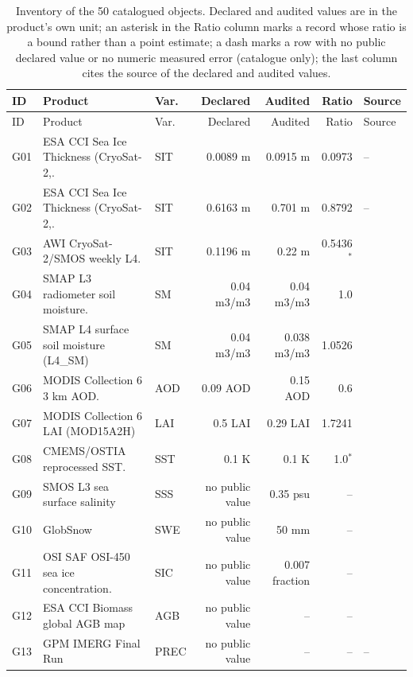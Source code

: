 \scriptsize
\setlength{\tabcolsep}{3pt}
\begin{longtable}{@{}l p{2.4cm} l r r r p{2.3cm}@{}}
\caption{Inventory of the 50 catalogued objects. Declared and audited values are in the product's own unit; an asterisk in the Ratio column marks a record whose ratio is a bound rather than a point estimate; a dash marks a row with no public declared value or no numeric measured error (catalogue only); the last column cites the source of the declared and audited values.}\label{tab:2}\\
\toprule
ID & Product & Var. & Declared & Audited & Ratio & Source \\
\midrule
\endfirsthead
\toprule
ID & Product & Var. & Declared & Audited & Ratio & Source \\
\midrule
\endhead
G01 & ESA CCI Sea Ice Thickness (CryoSat-2,. & SIT & 0.0089 m & 0.0915 m & 0.0973 & -- \\
G02 & ESA CCI Sea Ice Thickness (CryoSat-2,. & SIT & 0.6163 m & 0.701 m & 0.8792 & -- \\
G03 & AWI CryoSat-2\slash SMOS weekly L4. & SIT & 0.1196 m & 0.22 m & 0.5436$^{*}$ & \citep{ricker2017,sallila2019} \\
G04 & SMAP L3 radiometer soil moisture. & SM & 0.04 m3/m3 & 0.04 m3/m3 & 1.0 & \citep{entekhabi2010,colliander2017} \\
G05 & SMAP L4 surface soil moisture (L4\_SM) & SM & 0.04 m3/m3 & 0.038 m3/m3 & 1.0526 & \citep{entekhabi2010,reichle2017} \\
G06 & MODIS Collection 6 3 km AOD. & AOD & 0.09 AOD & 0.15 AOD & 0.6 & \citep{gupta2018} \\
G07 & MODIS Collection 6 LAI (MOD15A2H) & LAI & 0.5 LAI & 0.29 LAI & 1.7241 & \citep{yu2021} \\
G08 & CMEMS\slash OSTIA reprocessed SST. & SST & 0.1 K & 0.1 K & 1.0$^{*}$ & \citep{worsfold2024} \\
G09 & SMOS L3 sea surface salinity & SSS & no public value & 0.35 psu & -- & \citep{boutin2013} \\
G10 & GlobSnow & SWE & no public value & 50 mm & -- & \citep{mortimer2020} \\
G11 & OSI SAF OSI-450 sea ice concentration. & SIC & no public value & 0.007 fraction & -- & \citep{lavergne2019,kern2019} \\
G12 & ESA CCI Biomass global AGB map & AGB & no public value & -- & -- & \citep{araza2022} \\
G13 & GPM IMERG Final Run & PREC & no public value & -- & -- & -- \\

\end{longtable}
